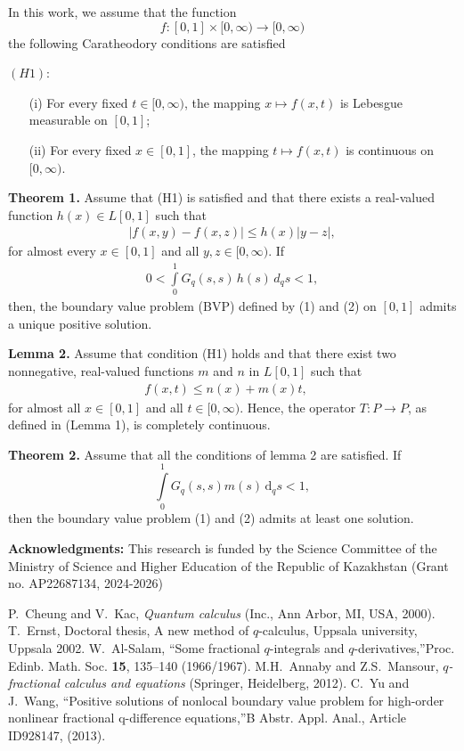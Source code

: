 \documentclass[12pt]{article}
\begin{document}
In this work, we assume that the function
\[
f: [0,1] \times [0,\infty) \to [0,\infty)
\]
the following Caratheodory conditions are satisfied

\((H1)\):
\begin{enumerate}
    \item[(i)] For every fixed \(t \in [0,\infty)\), the mapping \(x \mapsto f(x,t)\) is Lebesgue measurable on \([0,1]\);
    \item[(ii)] For every fixed \(x \in [0,1]\), the mapping \(t \mapsto f(x,t)\) is continuous on \([0,\infty)\).
\end{enumerate}


\textbf{Theorem 1.}
Assume that (H1) is satisfied and that there exists a real-valued function \(h(x) \in L[0,1]\) such that
\begin{eqnarray*}
|f(x,y) - f(x,z)| \leq h(x) |y - z|,
\end{eqnarray*}
for almost every   $x\in [0,1]$  and all $y, z \in [0,\infty)$.
If
\begin{eqnarray*}
0 < \int\limits_0^1 G_q(s,s)\, h(s) \, d_qs < 1,
\end{eqnarray*}
then, the boundary value problem (BVP) defined by (1) and (2) on \([0,1]\) admits a unique positive solution.

\textbf{Lemma 2.}
Assume that condition (H1) holds and that there exist two nonnegative, real-valued functions \(m\) and \(n\) in \(L[0,1]\) such that
\begin{eqnarray*}
f(x, t) \leq n(x)+m(x) t, \quad
\end{eqnarray*}
for almost all $x \in[0,1]$ and all $t \in[0, \infty)$.
Hence, the operator \(T: P \rightarrow P\), as defined in (Lemma 1), is completely continuous.


\textbf{Theorem 2.}
Assume that all the conditions of lemma 2 are satisfied. If
$$
\int\limits_0^1 G_q(s, s) m(s) \, \mathrm{d}_q s < 1,
$$
then the boundary value problem (1) and (2) admits at least one solution.


\textbf{Acknowledgments:}
This research is funded by the Science Committee of the Ministry of Science and Higher Education of the Republic of Kazakhstan (Grant no.
AP22687134, 2024-2026)


\begin{thebibliography}{00}\label{ref:ref}
  P.~Cheung and V.~Kac, \emph{Quantum calculus} (Inc., Ann Arbor, MI, USA, 2000).
 T.~Ernst, Doctoral thesis, A new method of $q$-calculus, Uppsala university, Uppsala 2002.
 W.~Al-Salam, \textquotedblleft Some fractional $q$-integrals and $q$-derivatives,\textquotedblright Proc. Edinb. Math. Soc. \textbf{15}, 135--140 (1966/1967).
  M.H.~Annaby and Z.S.~Mansour, \emph{$q$-fractional calculus and equations} (Springer, Heidelberg, 2012).
   C.~Yu and J.~Wang,  \textquotedblleft Positive solutions of nonlocal boundary value problem for high-order nonlinear fractional q-difference equations,\textquotedblright B Abstr. Appl. Anal., Article ID928147, (2013).
\end{thebibliography}
\end{document}
